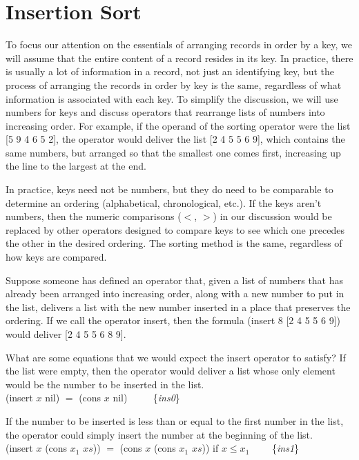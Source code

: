 \section{Insertion Sort}
\label{sec:insertion-sort}

To focus our attention on the essentials of
arranging records in order by a key, we will
assume that the entire content of a record
resides in its key.
In practice, there is usually a lot of information
in a record, not just an identifying key,
but the process of arranging the records
in order by key is the same, regardless
of what information is associated with each key.
To simplify the discussion,
we will use numbers for keys
and discuss operators that rearrange lists
of numbers into increasing order.
For example, if the operand of the sorting
operator were the list \textsf{[5 9 4 6 5 2]},
the operator would deliver the list \textsf{[2 4 5 5 6 9]},
which contains the same numbers, but arranged so
that the smallest one comes first, increasing up the
line to the largest at the end.

In practice, keys need not be numbers,
but they do need to be comparable
to determine an ordering (alphabetical, chronological, etc.).
If the keys aren't numbers,
then the numeric comparisons
($<$, $>$) in our discussion would be replaced by
other operators designed to compare
keys to see which one precedes the other
in the desired ordering.
The sorting method is the same, regardless
of how keys are compared.

Suppose someone has defined an operator that,
given a list of numbers that has
already been arranged into increasing order,
along with a new number to put in the list,
delivers a list with the new number inserted
in a place that preserves the ordering.
If we call the operator \textsf{insert}, then
the formula \textsf{(insert 8 [2 4 5 5 6 9])} would
deliver \textsf{[2 4 5 5 6 8 9]}.

What are some equations that we would expect
the insert operator to satisfy?
If the list were empty, then the operator
would deliver a list whose only element would
be the number to be inserted in the list.
\vspace{2mm}\\
\hspace*{5mm}\textsf{(insert $x$ nil) $=$ (cons $x$ nil)} ~~~~ \{\emph{ins0}\}
\vspace{2mm}

If the number to be inserted is less than or equal to the
first number in the list, the operator could simply
insert the number at the beginning of the list.
\vspace{2mm}\\
\hspace*{5mm}\textsf{(insert $x$ (cons $x_1$ $xs$)) $=$ (cons $x$ (cons $x_1$ $xs$))} if $x \le x_1$ ~~~~\{\emph{ins1}\}
\vspace{2mm}

